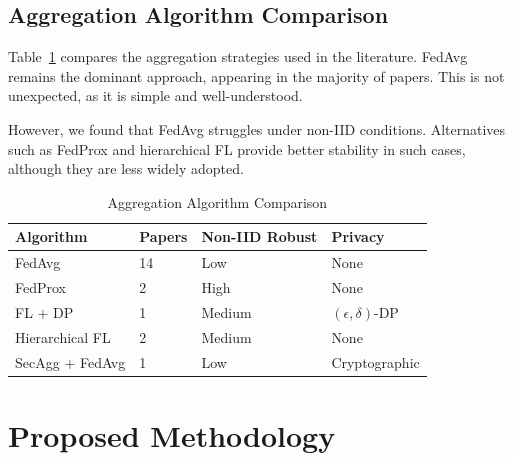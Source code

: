 \documentclass[conference]{IEEEtran}
\begin{document}
\subsection{Aggregation Algorithm Comparison}

Table~\ref{tab:aggregation} compares the aggregation strategies used in the literature. FedAvg remains the dominant approach, appearing in the majority of papers. This is not unexpected, as it is simple and well-understood.

However, we found that FedAvg struggles under non-IID conditions. Alternatives such as FedProx and hierarchical FL provide better stability in such cases, although they are less widely adopted.

\begin{table}[h]
\centering
\caption{Aggregation Algorithm Comparison}
\label{tab:aggregation}
\begin{tabular}{llll}
\hline
\textbf{Algorithm}      & \textbf{Papers} & \textbf{Non-IID Robust} & \textbf{Privacy} \\
\hline
FedAvg                  & 14 & Low      & None            \\
FedProx                 & 2  & High     & None            \\
FL + DP                 & 1  & Medium   & $(\epsilon,\delta)$-DP \\
Hierarchical FL         & 2  & Medium   & None            \\
SecAgg + FedAvg         & 1  & Low      & Cryptographic   \\
\hline
\end{tabular}
\end{table}


\section{Proposed Methodology}
\label{sec:methodology}
\end{document}
